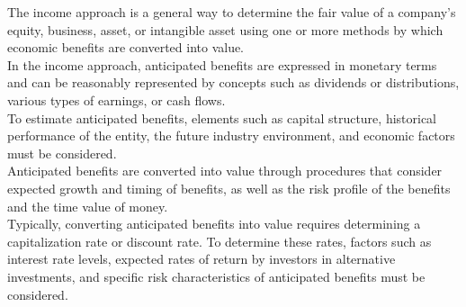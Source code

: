 The income approach is a general way to determine the fair value of a company's equity, business, asset, or intangible asset using one or more methods by which economic benefits are converted into value.\\[10pt]

In the income approach, anticipated benefits are expressed in monetary terms and can be reasonably represented by concepts such as dividends or distributions, various types of earnings, or cash flows.\\[10pt]

To estimate anticipated benefits, elements such as capital structure, historical performance of the entity, the future industry environment, and economic factors must be considered.\\[10pt]

Anticipated benefits are converted into value through procedures that consider expected growth and timing of benefits, as well as the risk profile of the benefits and the time value of money.\\[10pt]

Typically, converting anticipated benefits into value requires determining a capitalization rate or discount rate. To determine these rates, factors such as interest rate levels, expected rates of return by investors in alternative investments, and specific risk characteristics of anticipated benefits must be considered.\\[10pt]





